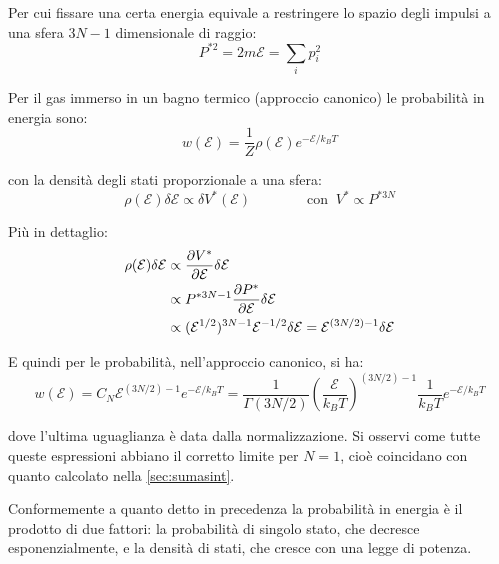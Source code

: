 Per cui fissare una certa energia equivale a restringere lo spazio degli impulsi a una sfera $3N-1$ dimensionale di raggio:
\begin{equation*}
	P^{\ast 2} = 2m \mathcal{E} = \sum_{i} p_i^2
\end{equation*}

Per il gas immerso in un bagno termico (approccio canonico) le probabilità in energia sono:
\begin{equation*}
	w(\mathcal{E}) = \frac{1}{Z} \rho(\mathcal{E}) e^{- \mathcal{E}/k_B T}
\end{equation*}

\noindent con la densità degli stati proporzionale a una sfera:
\begin{equation*}
\rho(\mathcal{E}) \delta \mathcal{E} \propto \delta V^\ast(\mathcal{E}) \qquad \qquad \text{con }~ V^\ast \propto P^{\ast{3N}}
\end{equation*}

\noindent Più in dettaglio:
\begin{align*}
\rho(\mathcal{E}) \delta \mathcal{E} &\propto \frac{\partial {V^\ast}}{\partial {\mathcal{E}}} \delta \mathcal{E}\\
&\propto P^{\ast{3N-1}} \frac{\partial {P^\ast}}{\partial {\mathcal{E}}} \delta \mathcal{E}\\
&\propto (\mathcal{E}^{1/2})^{3N-1}\mathcal{E}^{-1/2} \delta \mathcal{E} = \mathcal{E}^{(3N/2) - 1}\delta \mathcal{E}
\end{align*}

E quindi per le probabilità, nell'approccio canonico, si ha:
\begin{equation*}
w(\mathcal{E}) = C_N \mathcal{E}^{(3N/2)-1}e^{-\mathcal{E}/k_B T} = \frac{1}{\Gamma(3N/2)}\left(\frac{\mathcal{E}}{k_B T}\right)^{(3N/2)-1}\frac{1}{k_B T} e ^{- \mathcal{E}/k_B T}
\end{equation*}

\noindent dove l'ultima uguaglianza è data dalla normalizzazione. Si osservi come tutte queste espressioni abbiano il corretto limite per $N = 1$, cioè coincidano con quanto calcolato nella \cref{sec:sumasint}.

Conformemente a quanto detto in precedenza la probabilità in energia è il prodotto di due fattori: la probabilità di singolo stato, che decresce esponenzialmente, e la densità di stati, che cresce con una legge di potenza.

